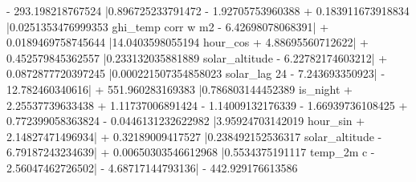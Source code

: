 - 293.198218767524 \left|{0.896725233791472  - 1.92705753960388  + 0.183911673918834 \left|{0.0251353476999353 ghi_{temp corr w m2} - 6.42698078068391}\right| + 0.0189469758745644 \left|{14.0403598055194 hour_{cos} + 4.88695560712622}\right| + 0.452579845362557 \left|{0.233132035881889 solar_{altitude} - 6.22782174603212}\right| + 0.0872877720397245 \left|{0.000221507354858023 solar_{lag 24} - 7.243693350923}\right| - 12.782460340616}\right| + 551.960283169383 \left|{0.786803144452389 is_{night} + 2.25537739633438  + 1.11737006891424  - 1.14009132176339  - 1.66939736108425  + 0.772399058363824  - 0.0446131232622982 \left|{3.95924703142019 hour_{sin} + 2.14827471496934}\right| + 0.32189009417527 \left|{0.238492152536317 solar_{altitude} - 6.79187243234639}\right| + 0.00650303546612968 \left|{0.5534375191117 temp_{2m c} - 2.56047462726502}\right| - 4.68717144793136}\right| - 442.929176613586